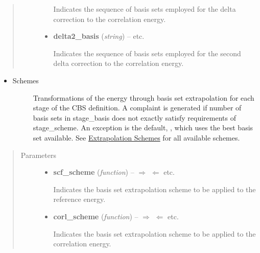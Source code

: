 \documentclass[letterpaper,10pt,english]{sphinxmanual}
\begin{document}
\begin{fulllineitems}
\begin{quote}
\begin{description}
\begin{itemize}
Indicates the sequence of basis sets employed for the delta correction
to the correlation energy.


\item {} 
\textbf{delta2\_basis} (\emph{string}) -- 
 \textbar{}\textbar{}  \textbar{}\textbar{}  \textbar{}\textbar{} etc.

Indicates the sequence of basis sets employed for the second delta correction
to the correlation energy.


\end{itemize}

\end{description}\end{quote}
\begin{itemize}
\item {} \begin{description}
\item[{Schemes}] \leavevmode
Transformations of the energy through basis set extrapolation for each
stage of the CBS definition. A complaint is generated if number of basis
sets in stage\_basis does not exactly satisfy requirements of stage\_scheme.
An exception is the default, , which uses the best basis
set available. See {\hyperref[index:extrapolation-schemes]{Extrapolation Schemes}} for all available schemes.

\end{description}

\end{itemize}
\begin{quote}\begin{description}
\item[{Parameters}] \leavevmode\begin{itemize}
\item {} 
\textbf{scf\_scheme} (\emph{function}) -- 
$\Rightarrow$  $\Leftarrow$ \textbar{}\textbar{}  \textbar{}\textbar{} etc.

Indicates the basis set extrapolation scheme to be applied to the reference energy.


\item {} 
\textbf{corl\_scheme} (\emph{function}) -- 
$\Rightarrow$  $\Leftarrow$ \textbar{}\textbar{}  \textbar{}\textbar{} etc.

Indicates the basis set extrapolation scheme to be applied to the correlation energy.



\end{itemize}
\end{description}
\end{quote}
\end{fulllineitems}
\end{document}
